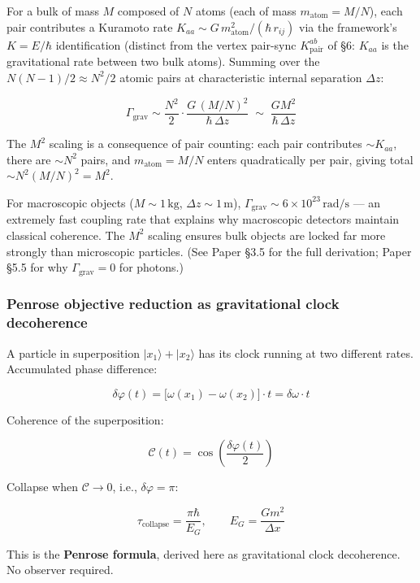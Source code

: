 \documentclass[
]{article}
\begin{document}
For a bulk of mass \(M\) composed of \(N\) atoms (each of mass
\(m_{\text{atom}} = M/N\)), each pair contributes a Kuramoto rate
\(K_{aa} \sim G\,m_{\text{atom}}^2/(\hbar\,r_{ij})\) via the framework's
\(K = E/\hbar\) identification (distinct from the vertex pair-sync
\(K_{\text{pair}}^{ab}\) of §6: \(K_{aa}\) is the gravitational rate
between two bulk atoms). Summing over the \(N(N-1)/2 \approx N^2/2\)
atomic pairs at characteristic internal separation \(\Delta z\):

\[\Gamma_{\text{grav}} \sim \frac{N^2}{2}\cdot \frac{G\,(M/N)^2}{\hbar\,\Delta z} \;\sim\; \boxed{\frac{G M^2}{\hbar\,\Delta z}}\]

The \(M^2\) scaling is a consequence of pair counting: each pair
contributes \(\sim K_{aa}\), there are \(\sim N^2\) pairs, and
\(m_{\text{atom}} = M/N\) enters quadratically per pair, giving total
\(\sim N^2 (M/N)^2 = M^2\).

For macroscopic objects (\(M \sim 1\,\text{kg}\),
\(\Delta z \sim 1\,\text{m}\)),
\(\Gamma_{\text{grav}} \sim 6\times10^{23}\,\text{rad/s}\) --- an
extremely fast coupling rate that explains why macroscopic detectors
maintain classical coherence. The \(M^2\) scaling ensures bulk objects
are locked far more strongly than microscopic particles. (See Paper §3.5
for the full derivation; Paper §5.5 for why \(\Gamma_{\text{grav}} = 0\)
for photons.)

\subsubsection{Penrose objective reduction as gravitational clock
decoherence}\label{penrose-objective-reduction-as-gravitational-clock-decoherence}

A particle in superposition \(|x_1\rangle + |x_2\rangle\) has its clock
running at two different rates. Accumulated phase difference:

\[\delta\varphi(t) = \bigl[\omega(x_1) - \omega(x_2)\bigr] \cdot t = \delta\omega \cdot t\]

Coherence of the superposition:

\[\mathcal{C}(t) = \cos\!\left(\frac{\delta\varphi(t)}{2}\right)\]

Collapse when \(\mathcal{C} \to 0\), i.e., \(\delta\varphi = \pi\):

\[\boxed{\tau_{\text{collapse}} = \frac{\pi\hbar}{E_G}, \qquad E_G = \frac{Gm^2}{\Delta x}}\]

This is the \textbf{Penrose formula}, derived here as gravitational
clock decoherence. No observer required.
\end{document}
